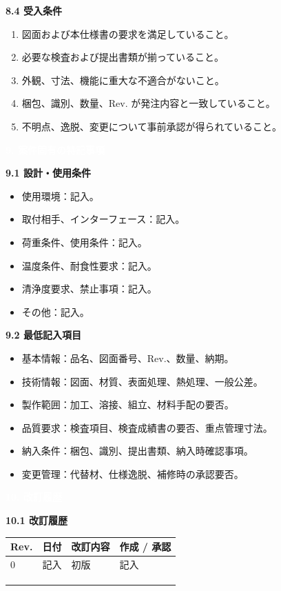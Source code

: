 \documentclass[a4paper,10pt]{ltjsarticle}
\makeatletter
\newlength{\SpecBodyWidth}
\newcommand{\PageTitle}[1]{%
  \vspace*{2mm}%
  \noindent\colorbox{SpecHead}{%
    \parbox{\dimexpr\SpecBodyWidth-2\fboxsep\relax}{%
      \large\bfseries\textcolor{white}{#1}%
    }%
  }%
  \par\vspace{5mm}%
}
\newcommand{\BlockTitle}[1]{%
  \vspace{4mm}%
  \noindent\colorbox{SpecSoft}{%
    \parbox{\dimexpr\SpecBodyWidth-2\fboxsep\relax}{%
      \normalsize\bfseries\textcolor{SpecHead}{#1}%
    }%
  }%
  \par\vspace{1.5mm}%
}
\newenvironment{SpecTable}[1]{%
  \par\vspace{1mm}%
  \noindent\footnotesize%
  \renewcommand{\arraystretch}{1.10}%
  \setlength{\tabcolsep}{3.0pt}%
  \begin{tabular*}{\SpecBodyWidth}{@{\extracolsep{\fill}}#1@{}}%
}{%
  \end{tabular*}%
  \par\vspace{1.5mm}%
}
\newcommand{\Head}[1]{\textbf{\textcolor{SpecHead}{#1}}}
\makeatother
\begin{document}
\BlockTitle{8.4 受入条件}
\begin{enumerate}
  \item 図面および本仕様書の要求を満足していること。
  \item 必要な検査および提出書類が揃っていること。
  \item 外観、寸法、機能に重大な不適合がないこと。
  \item 梱包、識別、数量、Rev. が発注内容と一致していること。
  \item 不明点、逸脱、変更について事前承認が得られていること。
\end{enumerate}

\clearpage

\PageTitle{9. 案件固有の特記事項}

\BlockTitle{9.1 設計・使用条件}
\begin{itemize}
  \item 使用環境：記入。
  \item 取付相手、インターフェース：記入。
  \item 荷重条件、使用条件：記入。
  \item 温度条件、耐食性要求：記入。
  \item 清浄度要求、禁止事項：記入。
  \item その他：記入。
\end{itemize}

\BlockTitle{9.2 最低記入項目}
\begin{itemize}
  \item 基本情報：品名、図面番号、Rev.、数量、納期。
  \item 技術情報：図面、材質、表面処理、熱処理、一般公差。
  \item 製作範囲：加工、溶接、組立、材料手配の要否。
  \item 品質要求：検査項目、検査成績書の要否、重点管理寸法。
  \item 納入条件：梱包、識別、提出書類、納入時確認事項。
  \item 変更管理：代替材、仕様逸脱、補修時の承認要否。
\end{itemize}

\clearpage

\PageTitle{10. 改訂履歴}

\BlockTitle{10.1 改訂履歴}
\begin{SpecTable}{|p{16mm}|p{28mm}|p{74mm}|p{28mm}|}
\hline
\Head{Rev.} & \Head{日付} & \Head{改訂内容} & \Head{作成 / 承認} \\
\hline
0 & 記入 & 初版 & 記入 \\
\hline
 &  &  &  \\
\hline
 &  &  &  \\
\hline
 &  &  &  \\
\hline
\end{SpecTable}
\end{document}
